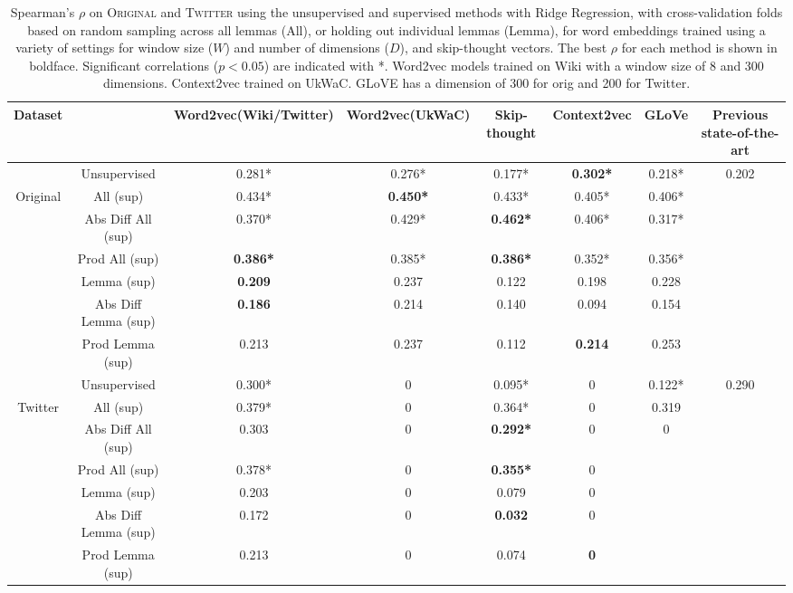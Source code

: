 \documentclass[11pt]{article}
\newcommand\original{\textsc{Original}\xspace}
\newcommand\twitter{\textsc{Twitter}\xspace}
\begin{document}
\begin{table*}
\begin{center}
\end{center}
\end{table*}


\begin{table*}
\begin{center}
\small
\begin{tabular}{cc|ccccc|c}

Dataset& &Word2vec(Wiki/Twitter) & Word2vec(UkWaC) & Skip-thought & Context2vec & GLoVe & Previous state-of-the-art \\
\hline

& Unsupervised  & 0.281* &0.276* & 0.177*& \textbf{0.302*}& 0.218* & \multirow{7}{*}{0.202}\\
Original &All (sup)  & 0.434*& \textbf{0.450*} & 0.433* & 0.405* & 0.406*\\
&Abs Diff All (sup)  & 0.370* &0.429* & \textbf{0.462*} & 0.406* & 0.317*\\
&Prod All (sup)  & \textbf{0.386*} & 0.385* & \textbf{0.386*} & 0.352* & 0.356*\\
&Lemma (sup)  & \textbf{0.209} &0.237& 0.122& 0.198 & 0.228 \\
&Abs Diff Lemma (sup)  &  \textbf{0.186} & 0.214 &0.140 & 0.094 &0.154 \\
&Prod Lemma (sup)  & 0.213 & 0.237 & 0.112 & \textbf{0.214} & 0.253\\
\hline

& Unsupervised  &0.300* & 0& 0.095*&  0 & 0.122* &\multirow{7}{*}{0.290}  \\
Twitter &All (sup)  & 0.379*& 0& 0.364*& 0& 0.319 & \\
&Abs Diff All (sup)  & 0.303 & 0 & \textbf{0.292*} & 0 & 0 \\
&Prod All (sup)  & 0.378* & 0 & \textbf{0.355*} & 0 & \\
&Lemma (sup) & 0.203 & 0& 0.079 & 0& & \\
&Abs Diff Lemma (sup)  & 0.172 & 0 & \textbf{0.032} & 0 & \\
&Prod Lemma (sup)  & 0.213 & 0 & 0.074 & \textbf{0} & \\
\hline
\end{tabular}
\caption{Spearman's $\rho$ on \original and \twitter using the
  unsupervised and supervised methods with Ridge Regression, with cross-validation folds
  based on random sampling across all lemmas (All), or holding out
  individual lemmas (Lemma), for word embeddings trained using a
  variety of settings for window size ($W$) and number of dimensions
  ($D$), and skip-thought vectors. The best $\rho$ for each method is
  shown in boldface. Significant correlations ($p<0.05$) are indicated
  with *. Word2vec models trained on Wiki with a window size of 8 and 300 dimensions. Context2vec trained on UkWaC. GLoVE has a dimension of 300 for orig and 200 for Twitter.
\label{tbl:results}}
\end{center}
\end{table*}
\end{document}
